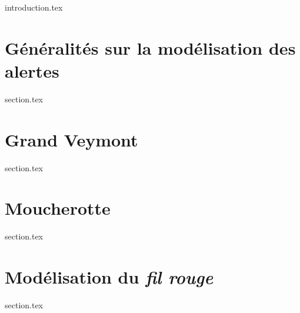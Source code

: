 
\chaptertoc{}

{introduction.tex}

\section{Généralités sur la modélisation des alertes}
\label{sec:9-1}
{section.tex}

\section{Grand Veymont}
\label{sec:9-2}
{section.tex}

\section{Moucherotte}
\label{sec:9-3}
{section.tex}

\section{Modélisation du \emph{fil rouge}}
\label{sec:9-4}
{section.tex}


